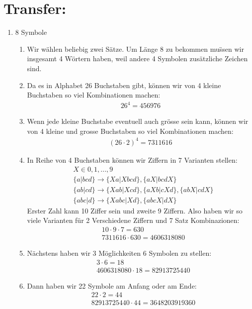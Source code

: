 	\section*{Transfer:}
	\begin{enumerate}[label=(\alph*)]
		\item 8 Symbole
		\begin{enumerate}[label=\bfseries Schritt \arabic*:]
			\item Wir w\"ahlen beliebig zwei S\"atze. Um L\"ange 8 zu bekommen mu\"ssen wir insgesamt 4 W\"ortern haben,
			weil andere 4 Symbolen zus\"atzliche Zeichen sind.

			\item Da es in Alphabet 26 Buchstaben gibt, k\"onnen wir von 4 kleine Buchstaben so viel Kombinationen machen:
			\begin{align*}
				26^4=456976
			\end{align*}

			\item Wenn jede kleine Buchstabe eventuell auch gr\"osse sein kann, k\"onnen wir von 4 kleine und grosse Buchstaben so viel Kombinationen machen:
			\begin{align*}
				(26\cdot2)^4=7311616
			\end{align*}

			\item In Reihe von 4 Buchstaben k\"onnen wir Ziffern in 7 Varianten stellen:
			\begin{align*}
				& X \in {0,1,...,9} \\
				& \{a|bcd\} \to \{Xa|Xbcd\},\{aX|bcdX\} \\
				& \{ab|cd\} \to \{Xab|Xcd\},\{aXb|cXd\}, \{abX|cdX\} \\
				& \{abc|d\} \to \{Xabc|Xd\},\{abcX|dX\}
			\end{align*}
			Erster Zahl kann 10 Ziffer sein und zweite 9 Ziffern. Also haben wir so viele Varianten f\"ur 2 Verschiedene 
			Ziffern und 7 Satz Kombinazionen:
			\begin{align*}
				& 10\cdot9\cdot7 = 630 \\
				& 7311616\cdot630 = 4606318080
			\end{align*}

			\item N\"achstens haben wir 3 M\"oglichkeiten 6 Symbolen zu stellen:
			\begin{align*}
				& 3\cdot6=18 \\
				& 4606318080\cdot18 = 82913725440
			\end{align*}

			\item Dann haben wir 22 Symbole am Anfang oder am Ende:
			\begin{align*}
				& 22\cdot2=44 \\
				& 82913725440\cdot44 = 3648203919360
			\end{align*}

		\end{enumerate}
	\end{enumerate}
